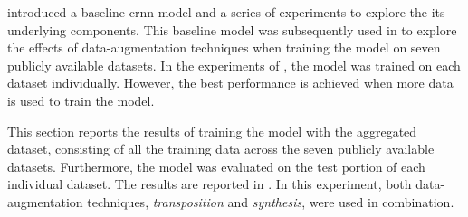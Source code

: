 
 introduced a baseline \gls{crnn}
model and a series of experiments to explore the its
underlying components. This baseline model was subsequently
used in  to explore the
effects of data-augmentation techniques when training the
model on seven publicly available datasets. In the
experiments of , the model
was trained on each dataset individually. However, the best
performance is achieved when more data is used to train the
model.

This section reports the results of training the model with
the aggregated dataset, consisting of all the training data
across the seven publicly available datasets. Furthermore,
the model was evaluated on the test portion of each
individual dataset. The results are reported in
. In this experiment, both
data-augmentation techniques, \emph{transposition} and
\emph{synthesis}, were used in combination. 

